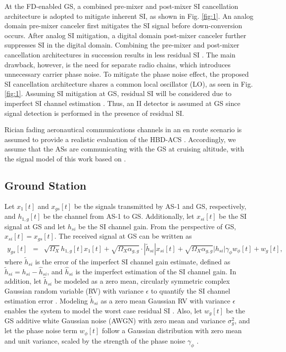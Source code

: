 At the FD-enabled GS, a combined pre-mixer and post-mixer SI cancellation architecture is adopted to mitigate inherent SI, as shown in Fig. \ref{fig:1}. An analog domain pre-mixer canceler first mitigates the SI signal before down-conversion occurs. After analog SI mitigation, a digital domain post-mixer canceler further suppresses SI in the digital domain. Combining the pre-mixer and post-mixer cancellation architectures in succession results in less residual SI \cite[Table II]{sahai2013impact}. The main drawback, however, is the need for separate radio chains, which introduces unnecessary carrier phase noise. To mitigate the phase noise effect, the proposed SI cancellation architecture shares a common local oscillator (LO), as seen in Fig. \ref{fig:1}. Assuming SI mitigation at GS, residual SI will be considered due to imperfect SI channel estimation \cite{sahai2013impact}. Thus, an II detector is assumed at GS since signal detection is performed in the presence of residual SI.

Rician fading aeronautical communications channels in an en route scenario is assumed to provide a realistic evaluation of the HBD-ACS \cite{haas2002aeronautical}. Accordingly, we assume that the ASs are communicating with the GS at cruising altitude, with the signal model of this work based on \cite{sahai2013impact}.

\subsection{Ground Station}

Let $x_1[t]$ and $x_{gs}[t]$ be the signals transmitted by AS-1 and GS, respectively, and $h_{1,g}[t]$ be the channel from AS-1 to GS. Additionally, let $x_{si}[t]$ be the SI signal at GS and let $h_{si}$ be the SI channel gain. From the perspective of GS, $x_{si}[t]=x_{gs}[t]$. The received signal at GS can be written as 
\begin{eqnarray} \label{y_gs}
y_{gs}[t] & = & \sqrt{\Omega_{X}}h_{1,g}[t]x_{1}[t] + \sqrt{\Omega_X\alpha_{g,g}} \cdot |\widetilde{h}_{si}|x_{si}[t] + \sqrt{\Omega_X\alpha_{g,g}}|h_{si}|\gamma_{\phi}w_{\phi}[t] + w_{g}[t],
\end{eqnarray}
where $\widetilde{h}_{si}$ is the error of the imperfect SI channel gain estimate, defined as $\widetilde{h}_{si}=h_{si}-\widehat{h}_{si}$, and $\widehat{h}_{si}$ is the imperfect estimation of the SI channel gain. In addition, let $\widetilde{h}_{si}$ be modeled as a zero mean, circularly symmetric complex Gaussian random variable (RV) with variance $\epsilon$ to quantify the SI channel estimation error \cite{zlatanov2017capacity}. Modeling $\widetilde{h}_{si}$ as a zero mean Gaussian RV with variance $\epsilon$ enables the system to model the worst case residual SI \cite{zlatanov2017capacity}. Also, let $w_{g}[t]$ be the GS additive white Gaussian noise (AWGN) with zero mean and variance $\sigma^2_{g}$, and let the phase noise term $w_{\phi}[t]$ follow a Gaussian distribution with zero mean and unit variance, scaled by the strength of the phase noise $\gamma_{\phi}$ \cite{sahai2013impact}. 

